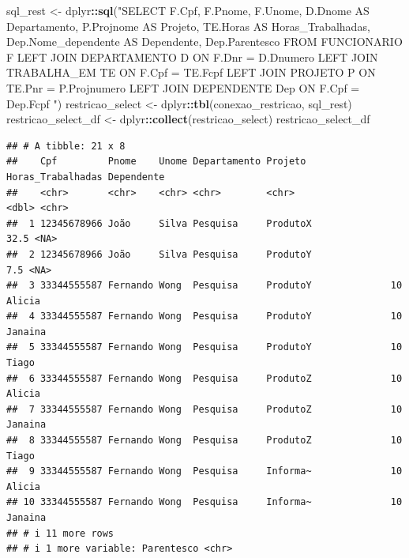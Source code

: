 \documentclass[
]{article}
\newenvironment{Shaded}{\begin{snugshade}}{\end{snugshade}}
\newcommand{\FunctionTok}[1]{\textcolor[rgb]{0.13,0.29,0.53}{\textbf{#1}}}
\newcommand{\NormalTok}[1]{#1}
\newcommand{\OtherTok}[1]{\textcolor[rgb]{0.56,0.35,0.01}{#1}}
\newcommand{\SpecialCharTok}[1]{\textcolor[rgb]{0.81,0.36,0.00}{\textbf{#1}}}
\newcommand{\StringTok}[1]{\textcolor[rgb]{0.31,0.60,0.02}{#1}}
\begin{document}
\begin{Shaded}
\begin{Highlighting}[]
\NormalTok{sql\_rest }\OtherTok{\textless{}{-}}\NormalTok{ dplyr}\SpecialCharTok{::}\FunctionTok{sql}\NormalTok{(}\StringTok{"SELECT }
\StringTok{    F.Cpf, }
\StringTok{    F.Pnome, }
\StringTok{    F.Unome, }
\StringTok{    D.Dnome AS Departamento, }
\StringTok{    P.Projnome AS Projeto, }
\StringTok{    TE.Horas AS Horas\_Trabalhadas, }
\StringTok{    Dep.Nome\_dependente AS Dependente,}
\StringTok{    Dep.Parentesco}
\StringTok{FROM }
\StringTok{    FUNCIONARIO F}
\StringTok{LEFT JOIN }
\StringTok{    DEPARTAMENTO D ON F.Dnr = D.Dnumero}
\StringTok{LEFT JOIN }
\StringTok{    TRABALHA\_EM TE ON F.Cpf = TE.Fcpf}
\StringTok{LEFT JOIN }
\StringTok{    PROJETO P ON TE.Pnr = P.Projnumero}
\StringTok{LEFT JOIN }
\StringTok{    DEPENDENTE Dep ON F.Cpf = Dep.Fcpf}
\StringTok{"}\NormalTok{)}
\NormalTok{restricao\_select }\OtherTok{\textless{}{-}}\NormalTok{ dplyr}\SpecialCharTok{::}\FunctionTok{tbl}\NormalTok{(conexao\_restricao, sql\_rest)}
\NormalTok{restricao\_select\_df }\OtherTok{\textless{}{-}}\NormalTok{ dplyr}\SpecialCharTok{::}\FunctionTok{collect}\NormalTok{(restricao\_select)}
\NormalTok{restricao\_select\_df}
\end{Highlighting}
\end{Shaded}

\begin{verbatim}
## # A tibble: 21 x 8
##    Cpf         Pnome    Unome Departamento Projeto  Horas_Trabalhadas Dependente
##    <chr>       <chr>    <chr> <chr>        <chr>                <dbl> <chr>     
##  1 12345678966 João     Silva Pesquisa     ProdutoX              32.5 <NA>      
##  2 12345678966 João     Silva Pesquisa     ProdutoY               7.5 <NA>      
##  3 33344555587 Fernando Wong  Pesquisa     ProdutoY              10   Alicia    
##  4 33344555587 Fernando Wong  Pesquisa     ProdutoY              10   Janaina   
##  5 33344555587 Fernando Wong  Pesquisa     ProdutoY              10   Tiago     
##  6 33344555587 Fernando Wong  Pesquisa     ProdutoZ              10   Alicia    
##  7 33344555587 Fernando Wong  Pesquisa     ProdutoZ              10   Janaina   
##  8 33344555587 Fernando Wong  Pesquisa     ProdutoZ              10   Tiago     
##  9 33344555587 Fernando Wong  Pesquisa     Informa~              10   Alicia    
## 10 33344555587 Fernando Wong  Pesquisa     Informa~              10   Janaina   
## # i 11 more rows
## # i 1 more variable: Parentesco <chr>
\end{verbatim}
\end{document}
